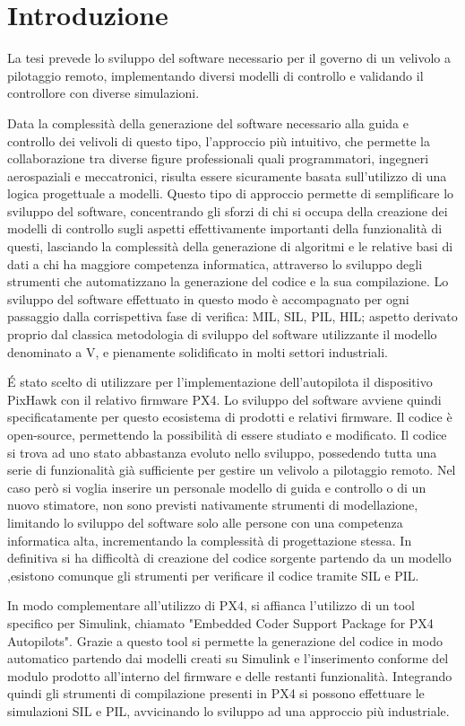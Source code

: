\chapter{Introduzione}
La tesi prevede lo sviluppo del software necessario per il governo di un velivolo a pilotaggio remoto, implementando diversi modelli di controllo e validando il controllore con diverse simulazioni.

Data la complessità della generazione del software necessario alla guida e controllo dei velivoli di questo tipo, l'approccio più intuitivo, che permette la collaborazione tra diverse figure professionali quali programmatori, ingegneri aerospaziali e meccatronici, risulta essere sicuramente basata sull'utilizzo di una logica progettuale a modelli. Questo tipo di approccio permette di semplificare lo sviluppo del software, concentrando gli sforzi di chi si occupa della creazione dei modelli di controllo sugli aspetti effettivamente importanti della funzionalità di questi, lasciando la complessità della generazione di algoritmi e le relative basi di dati a chi ha maggiore competenza informatica, attraverso lo sviluppo degli strumenti che automatizzano la generazione del codice e la sua compilazione. 
Lo sviluppo del software effettuato in questo modo è accompagnato per ogni passaggio dalla corrispettiva fase di verifica: MIL, SIL, PIL, HIL; aspetto derivato proprio dal classica metodologia di sviluppo del software utilizzante il modello denominato a V, e pienamente solidificato in molti settori industriali.

\'E stato scelto di utilizzare per l'implementazione dell'autopilota il dispositivo PixHawk con il relativo firmware PX4. Lo sviluppo del software avviene quindi specificatamente per questo ecosistema di prodotti e relativi firmware. Il codice è open-source, permettendo la possibilità di essere studiato e modificato. Il codice si trova ad uno stato abbastanza evoluto nello sviluppo, possedendo tutta una serie di funzionalità già sufficiente per gestire un velivolo a pilotaggio remoto. Nel caso però si voglia inserire un personale modello di guida e controllo o di un nuovo stimatore, non sono previsti nativamente strumenti di modellazione, limitando lo sviluppo del software solo alle persone con una competenza informatica alta, incrementando la complessità di progettazione stessa. In definitiva si ha difficoltà di creazione del codice sorgente partendo da un modello ,esistono comunque gli strumenti per verificare il codice tramite SIL e PIL.

In modo complementare all'utilizzo di PX4, si affianca l'utilizzo di un tool specifico per Simulink, chiamato "Embedded Coder Support Package
for PX4 Autopilots". Grazie a questo tool si permette la generazione del codice in modo automatico partendo dai modelli creati su Simulink e l'inserimento conforme del modulo prodotto all'interno del firmware e delle restanti funzionalità. Integrando quindi gli strumenti di compilazione presenti in PX4 si possono effettuare le simulazioni SIL e PIL, avvicinando lo sviluppo ad una approccio più industriale.

